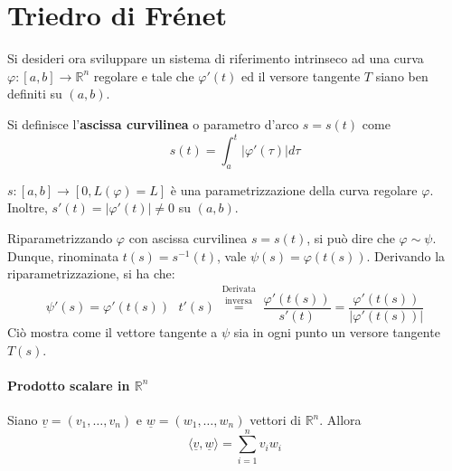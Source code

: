 \section{Triedro di Frénet}
Si desideri ora sviluppare un sistema di riferimento intrinseco ad una curva $\varphi:[a, b] \to \mathbb{R}^n$ regolare e tale che $\varphi'(t)$ ed il versore tangente $T$ siano ben definiti su $(a, b)$.
\begin{definition}
    Si definisce l'\textbf{ascissa curvilinea} o parametro d'arco $s=s(t)$ come
    \begin{equation*}
        s(t)=\int_a^t{\left\lvert \varphi'(\tau) \right\rvert d\tau}
    \end{equation*}
    \end{definition}
    \begin{oss}
        $s:[a,b] \to [0, L(\varphi)=L]$ è una parametrizzazione della curva regolare $\varphi$. Inoltre, $s'(t)=|\varphi'(t)| \neq 0$ su $(a,b)$.
    \end{oss} 
    \begin{oss}
        Riparametrizzando $\varphi$ con ascissa curvilinea $s=s(t)$, si può dire che $\varphi\sim\psi$. Dunque, rinominata $t(s)=s^{-1}(t)$, vale $\psi(s)=\varphi(t(s))$. Derivando la riparametrizzazione, si ha che:
        \begin{equation*}
            \psi'(s)=\varphi'(t(s)) \text{ } t'(s) \overset{\substack{\text{Derivata}\\\text{ inversa}}}{=} \frac{\varphi'(t(s))}{s'(t)} = \frac{\varphi'(t(s))}{|\varphi'(t(s))|}
        \end{equation*}
        Ciò mostra come il vettore tangente a $\psi$ sia in ogni punto un versore tangente $T(s)$.
    \end{oss}

\paragraph{Prodotto scalare in $\mathbb{R}^n$}
Siano $\underline{v}=(v_1, \dots, v_n)$ e $\underline{w}=(w_1, \dots, w_n)$ vettori di $\mathbb{R}^n$. Allora
\begin{equation*}
    \langle \underline{v}, \underline{w} \rangle = \sum\limits_{i=1}^{n}{v_iw_i} 
\end{equation*}

